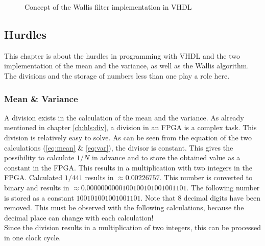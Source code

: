 \begin{figure}[tb!]
    \centering
    \begin{adjustbox}{max width=\textwidth}
        
    \end{adjustbox}
    \caption{Concept of the Wallis filter implementation in VHDL}
    \label{fig:wallis_vhdl}
\end{figure}

\subsection{Hurdles} \label{ch:ip:hurdles_vhdl}
This chapter is about the hurdles in programming with VHDL and the two
implementation of the mean and the variance, as well as the Wallis algorithm.
The divisions and the storage of numbers less than one play a role here.

\subsubsection*{Mean \& Variance}
A division exists in the calculation of the mean and the variance. As already mentioned in chapter \ref{ch:hls:div}, a division in an FPGA is a complex task.
This division is relatively easy to solve. As can be seen from the equation of the two calculations (\ref{eq:mean} \& \ref{eq:var}), the divisor is constant. This gives the possibility to calculate $1/N$ in advance and to store the obtained value as a constant in the FPGA. This results in a multiplication with two integers in the FPGA.
Calculated $1/441$ results in $\approx 0.00226757$. This number is converted to binary and results in $\approx 0.0000000000100100101001001101$. The following number is stored as a constant $100101001001001101$. Note that 8 decimal digits have been removed. This must be observed with the following calculations, because the decimal place can change with each calculation! \\
Since the division results in a multiplication of two integers, this can be processed in one clock cycle.

